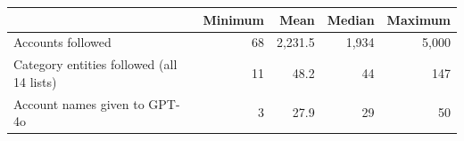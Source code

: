 \begin{tabular}{lrrrr}
\toprule
 & Minimum & Mean & Median & Maximum \\
\midrule
Accounts followed & 68 & 2,231.5 & 1,934 & 5,000 \\
Category entities followed (all 14 lists) & 11 & 48.2 & 44 & 147 \\
Account names given to GPT-4o & 3 & 27.9 & 29 & 50 \\
\bottomrule
\end{tabular}
